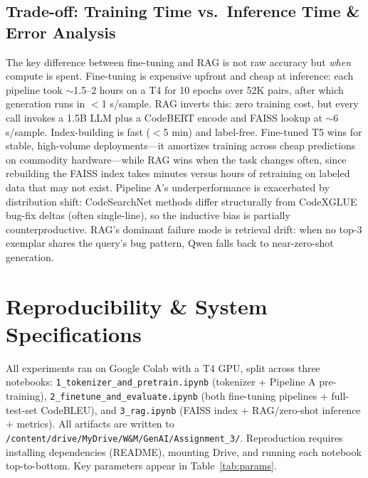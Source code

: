 \documentclass[letterpaper,12pt]{article}
\begin{document}
\vspace{-0.5cm}
\subsection{Trade-off: Training Time vs.\ Inference Time \& Error Analysis} \vspace{-0.1cm}

The key difference between fine-tuning and RAG is not raw accuracy but \textit{when} compute is spent. Fine-tuning is expensive upfront and cheap at inference: each pipeline took $\sim$1.5--2 hours on a T4 for 10 epochs over 52K pairs, after which generation runs in $<$1 s/sample. RAG inverts this: zero training cost, but every call invokes a 1.5B LLM plus a CodeBERT encode and FAISS lookup at $\sim$6 s/sample. Index-building is fast ($<$5 min) and label-free. Fine-tuned T5 wins for stable, high-volume deployments---it amortizes training across cheap predictions on commodity hardware---while RAG wins when the task changes often, since rebuilding the FAISS index takes minutes versus hours of retraining on labeled data that may not exist. Pipeline A's underperformance is exacerbated by distribution shift: CodeSearchNet methods differ structurally from CodeXGLUE bug-fix deltas (often single-line), so the inductive bias is partially counterproductive. RAG's dominant failure mode is retrieval drift: when no top-3 exemplar shares the query's bug pattern, Qwen falls back to near-zero-shot generation.


\vspace{-0.3cm}
\section{Reproducibility \& System Specifications} \vspace{-0.1cm}

All experiments ran on Google Colab with a T4 GPU, split across three notebooks: \texttt{1\_tokenizer\_and\_pretrain.ipynb} (tokenizer + Pipeline A pre-training), \texttt{2\_finetune\_and\_evaluate.ipynb} (both fine-tuning pipelines + full-test-set CodeBLEU), and \texttt{3\_rag.ipynb} (FAISS index + RAG/zero-shot inference + metrics). All artifacts are written to \texttt{/content/drive/MyDrive/W\&M/GenAI/Assignment\_3/}. Reproduction requires installing dependencies (README), mounting Drive, and running each notebook top-to-bottom. Key parameters appear in Table~\ref{tab:params}.
\end{document}
